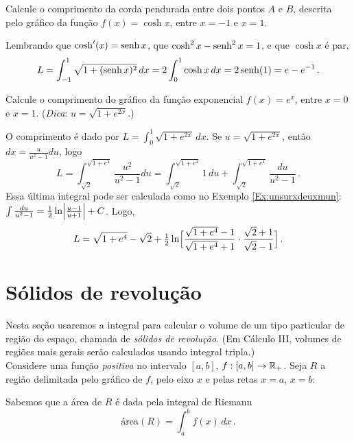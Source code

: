 \begin{exo}
Calcule o comprimento da corda pendurada entre dois pontos $A$ e $B$, descrita pelo gráfico
 da função $f(x)=\cosh x$, entre $x=-1$ e $x=1$.  
\begin{sol}
Lembrando que $\cosh'(x)=\operatorname{senh} x$, que $\cosh^2 x-\operatorname{senh}^2x=1$, e que $\cosh x$ é par,
\begin{align*}
 L=\int_{-1}^1\sqrt{1+(\operatorname{senh} x)^2}\,dx=2\int_{0}^1\cosh x\,dx=2\operatorname{senh} (1)=e-e^{-1}\,.
\end{align*} 
\end{sol}
\end{exo}

\begin{exo}\label{Exo_finalmente}
Calcule o comprimento do gráfico da função exponencial $f(x)=e^x$, entre $x=0$
e $x=1$. (\emph{Dica}: $u=\sqrt{1+e^{2x}}$.)
\begin{sol}
O comprimento é dado por $L=\int_0^1\sqrt{1+e^{2x}}\,dx$.
Se $u=\sqrt{1+e^{2x}}$, então $dx=\frac{u}{u^2-1}du$, logo
$$L=\int_{\sqrt{2}}^{\sqrt{1+e^4}}\frac{u^2}{u^2-1}du
=\int_{\sqrt{2}}^{\sqrt{1+e^4}}1\,du+\int_{\sqrt{2}}^{\sqrt{1+e^4}}\frac{du}{
u^2-1}\,.
$$ 
Essa última integral pode ser calculada como no Exemplo \ref{Ex:unsurxdeuxmun}:
$\int\frac{du}{
u^2-1}=\tfrac{1}{2}\ln\Bigl|\frac{u-1}{u+1}\Bigr|+C$. Logo,
$$
L=\sqrt{1+e^4}-\sqrt{2}+\tfrac12\ln\Bigl[\frac{\sqrt{1+e^4}-1}{\sqrt{1+e^4}
+1}\cdot\frac{\sqrt{2}+1}{\sqrt{2}-1}\Bigr]\,.
$$
\end{sol}
\end{exo}

\section{Sólidos de revolução}\label{Sec_Solidos}
Nesta seção usaremos a integral para calcular o volume de um 
tipo particular de região do
espaço, chamada de \emph{sólidos de revolução}. (Em Cálculo III, volumes de regiões mais
gerais serão calculados usando integral tripla.)\\

Considere uma função \emph{positiva} no intervalo $[a,b]$, $f:[a,b]\to
\mathbb{R}_+$. Seja $R$ a região 
delimitada pelo gráfico de $f$, pelo eixo $x$ e pelas retas $x=a$,
$x=b$:
\begin{center}
\begin{bmlimage}\end{bmlimage}
\end{center}
Sabemos que a área de $R$ é dada pela integral de Riemann 
$$\text{área}(R)=\int_a^bf(x)\,dx\,.$$

